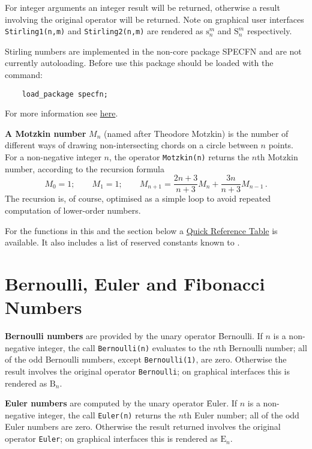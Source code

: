 For integer arguments an integer result will be
returned, otherwise a result involving the original operator will be returned.
Note on graphical user interfaces \texttt{Stirling1(n,m)} and
\texttt{Stirling2(n,m)} are rendered as
$\mathrm{s}_n^m$ and $\mathrm{S}_n^m$ respectively.

Stirling numbers are implemented in the non-core package SPECFN and are
not currently autoloading. Before use this package should be loaded with the
command:
\begin{verbatim}
    load_package specfn;
\end{verbatim}
For more information see \hyperlink{STIRL}{here}.

\hypertarget{operator:MOTZKIN}{}
\textbf{A Motzkin number} $M_{n}$ (named after Theodore Motzkin) is the
number of different ways of drawing non-intersecting chords on a circle between
$n$ points. For a non-negative integer $n$, the operator \texttt{Motzkin(n)}
returns the $n$th Motzkin number, according to the recursion formula
\[
  M_{0} = 1; \qquad M_{1}=1; \qquad
  M_{n+1} = \frac{2n+3}{n+3}M_{n}+ \frac{3n}{n+3}M_{n-1}\,.
\]
The recursion is, of course, optimised as a simple loop to avoid repeated
computation of lower-order numbers.

For the functions in this and the section below
a \hyperlink{SPECFNTAB4}{Quick Reference Table} is available.
It also includes a list of reserved constants known to {\REDUCE}.

\section{Bernoulli, Euler and Fibonacci Numbers}
\hypertarget{operator:BERNOULLI}{}
\textbf{Bernoulli numbers} are provided by the unary operator
\f{Bernoulli}. If $n$ is a non-negative integer, the call \texttt{Bernoulli(n)}
evaluates to the $n$th Bernoulli number; all of the odd Bernoulli numbers,
except \texttt{Bernoulli(1)}, are zero. Otherwise the result involves the
original operator \texttt{Bernoulli}; on graphical interfaces this is rendered
as $\mathrm{B}_n$.

\hypertarget{operator:EULER}{}
\textbf{Euler numbers} are computed by the unary operator \f{Euler}.  If $n$
is a non-negative integer, the call \texttt{Euler(n)} returns the $n$th
Euler number; all of the odd Euler numbers are zero.
Otherwise the result returned involves the original operator \texttt{Euler};
on graphical interfaces this is rendered
as $\mathrm{E}_n$.

